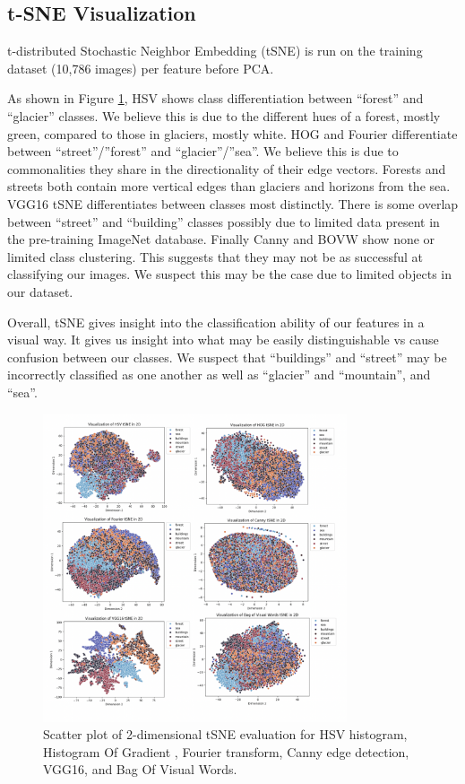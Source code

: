 \documentclass[11pt]{article}
\begin{document}
\subsection{t-SNE Visualization}
t-distributed Stochastic Neighbor Embedding (tSNE) is run on the training dataset (10,786 images) per feature before PCA.

As shown in Figure \ref{fig:tsne}, HSV shows class differentiation between “forest” and “glacier” classes. We believe this is due to the different hues of a forest, mostly green, compared to those in glaciers, mostly white. HOG and Fourier differentiate between “street”/”forest” and “glacier”/”sea”. We believe this is due to commonalities they share in the directionality of their edge vectors. Forests and streets both contain more vertical edges than glaciers and horizons from the sea. VGG16 tSNE differentiates between classes most distinctly. There is some overlap between “street” and “building” classes possibly due to limited data present in the pre-training ImageNet database. Finally Canny and BOVW show none or limited class clustering. This suggests that they may not be as successful at classifying our images. We suspect this may be the case due to limited objects in our dataset.

Overall, tSNE gives insight into the classification ability of our features in a visual way. It gives us insight into what may be easily distinguishable vs cause confusion between our classes. We suspect that “buildings” and “street” may be incorrectly classified as one another as well as “glacier” and “mountain”, and “sea”.

\begin{figure}[h!]
\centering
\includegraphics[width=0.8\textwidth]{tsne.png}
\caption{Scatter plot of 2-dimensional tSNE evaluation for HSV histogram, Histogram Of Gradient , Fourier transform, Canny edge detection, VGG16, and Bag Of Visual Words.
}
\label{fig:tsne}
\end{figure}
\end{document}
